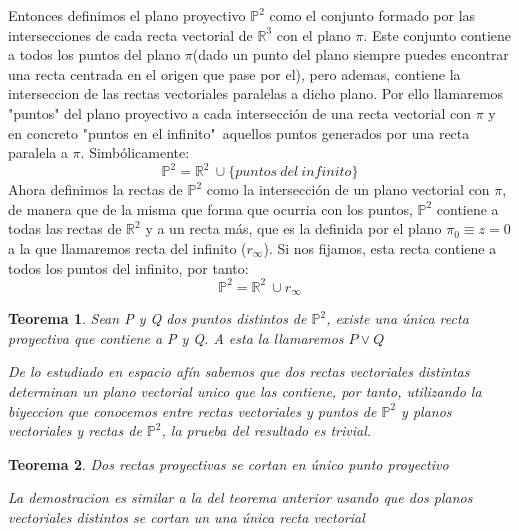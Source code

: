 \documentclass[11pt, a4paper, titlepage]{article}
\makeatletter
\renewenvironment{proof}[1][\proofname] {\vspace{-15pt}\par\pushQED{\qed}\normalfont\topsep6\p@\@plus6\p@\relax\trivlist\item[\hskip\labelsep\it#1\@addpunct{.}]\ignorespaces}{\popQED\endtrivlist\@endpefalse}
\renewenvironment{proof}[1][\proofname] {\par\pushQED{\qed}\normalfont\topsep6\p@\@plus6\p@\relax\trivlist\item[\hskip\labelsep\itshape\sffamily#1\@addpunct{.}]\ignorespaces}{\popQED\endtrivlist\@endpefalse}
\theoremstyle{theorem-style}
\newtheorem{nth}{Teorema}[section]
\theoremstyle{definition-style}
\theoremstyle{remark-style}
\theoremstyle{example-style}
\makeatother
\begin{document}
Entonces definimos el plano proyectivo $\mathbb{P}^2$ como el conjunto formado por las intersecciones de cada recta vectorial de $\mathbb{R}^3$ con el plano $\pi$. Este conjunto contiene a todos los puntos del plano $\pi$(dado un punto del plano siempre puedes encontrar una recta centrada en el origen que pase por el), pero ademas, contiene la interseccion de las rectas vectoriales paralelas a dicho plano. Por ello llamaremos "puntos" del plano proyectivo a cada intersección de una recta vectorial con $\pi$ y en concreto "puntos en el infinito"\ aquellos puntos generados por una recta paralela a $\pi$. Simbólicamente:
$$\mathbb{P}^2 = \mathbb{R}^2\ \cup \{puntos\ del\ infinito\}$$
Ahora definimos la rectas de $\mathbb{P}^2$ como la intersección de un plano vectorial con $\pi$, de manera que de la misma que forma que ocurria con los puntos, $\mathbb{P}^2$ contiene a todas las rectas de $\mathbb{R}^2$ y a un recta más, que es la definida por el plano $\pi_0 \equiv z= 0$ a la que llamaremos recta del infinito ($r_\infty$). Si nos fijamos, esta recta contiene a todos los puntos del infinito, por tanto:
$$\mathbb{P}^2 = \mathbb{R}^2\ \cup r_\infty$$

\begin{nth}
Sean P y Q dos puntos distintos de $\mathbb{P}^2$, existe una única recta proyectiva que contiene a P y Q. A esta la llamaremos $P \vee Q$
\\

\begin{proof}

De lo estudiado en espacio afín sabemos que dos rectas vectoriales distintas determinan un plano vectorial unico que las contiene, por tanto, utilizando la biyeccion que conocemos entre rectas vectoriales y puntos de $\mathbb{P}^2$ y planos vectoriales y rectas de $\mathbb{P}^2$, la prueba del resultado es trivial.
\end{proof}
\end{nth}

\begin{nth}
Dos rectas proyectivas se cortan en único  punto proyectivo
\\

\begin{proof}
La demostracion es similar a la del teorema anterior usando que dos planos vectoriales distintos se cortan un una única recta vectorial
\end{proof}

\end{nth}
\end{document}
